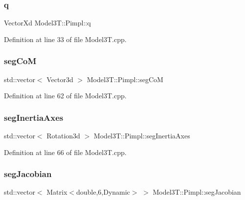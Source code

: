 \subsubsection{\texorpdfstring{q}{q}}
{\footnotesize\ttfamily Vector\+Xd Model3\+T\+::\+Pimpl\+::q}



Definition at line 33 of file Model3\+T.\+cpp.

\hypertarget{structModel3T_1_1Pimpl_add8bdb5e94533189b2173a43102eee84}{}\label{structModel3T_1_1Pimpl_add8bdb5e94533189b2173a43102eee84} 
\subsubsection{\texorpdfstring{seg\+CoM}{segCoM}}
{\footnotesize\ttfamily std\+::vector$<$ Vector3d $>$ Model3\+T\+::\+Pimpl\+::seg\+CoM}



Definition at line 62 of file Model3\+T.\+cpp.

\hypertarget{structModel3T_1_1Pimpl_aeb0889ba54a539cba37b30d2826ad61b}{}\label{structModel3T_1_1Pimpl_aeb0889ba54a539cba37b30d2826ad61b} 
\subsubsection{\texorpdfstring{seg\+Inertia\+Axes}{segInertiaAxes}}
{\footnotesize\ttfamily std\+::vector$<$ Rotation3d $>$ Model3\+T\+::\+Pimpl\+::seg\+Inertia\+Axes}



Definition at line 66 of file Model3\+T.\+cpp.

\hypertarget{structModel3T_1_1Pimpl_ab1a67acf0553a0bf04275f5f20c2a69e}{}\label{structModel3T_1_1Pimpl_ab1a67acf0553a0bf04275f5f20c2a69e} 
\subsubsection{\texorpdfstring{seg\+Jacobian}{segJacobian}}
{\footnotesize\ttfamily std\+::vector$<$ Matrix$<$double,6,Dynamic$>$ $>$ Model3\+T\+::\+Pimpl\+::seg\+Jacobian}




